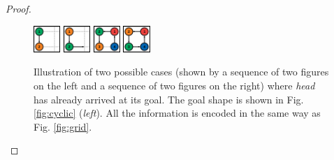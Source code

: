 \documentclass[journal]{IEEEtran}
\begin{document}
\begin{proof}
\begin{figure}[H]
 \centering
{\includegraphics[width=0.09\textwidth]{acyclic/0.jpg}}
{\includegraphics[width=0.09\textwidth]{acyclic/1.jpg}}\hfill
{\includegraphics[width=0.09\textwidth]{acyclic/2.jpg}}
{\includegraphics[width=0.09\textwidth]{acyclic/3.jpg}}
\caption{Illustration of two possible cases (shown by a sequence of two figures on the left and a sequence of two figures on the right) where \textit{head} has already arrived at its goal. The goal shape is shown in Fig. \ref{fig:cyclic} (\textit{left}). All the information is encoded in the same way as Fig. \ref{fig:grid}.}
\label{fig:acyclic}
\end{figure}
\end{proof}
\end{document}
